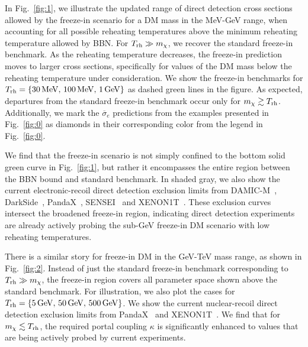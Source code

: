 \documentclass[notitlepage,nofootinbib,preprintnumbers,aps,superscriptaddress,twocolumn]{revtex4-1}
\begin{document}
In Fig.~\ref{fig:1}, we illustrate the updated range of direct detection cross sections allowed by the freeze-in scenario for a DM mass in the MeV-GeV range, when accounting for all possible reheating temperatures above the minimum reheating temperature allowed by BBN. For $T_{\rm rh}\gg m_\chi$, we recover the standard freeze-in benchmark. As the reheating temperature decreases, the freeze-in prediction moves to larger cross sections, specifically for values of the DM mass below the reheating temperature under consideration. We show the freeze-in benchmarks for $T_{\rm{rh}}=\{30\,\mathrm{MeV},\,100\,\mathrm{MeV},\, 1\,\mathrm{GeV}\}$ as dashed green lines in the figure. As expected, departures from the standard freeze-in benchmark occur only for $m_\chi\gtrsim T_{\rm{rh}}$. Additionally, we mark the $\overline{\sigma}_e$ predictions from the examples presented in Fig.~\ref{fig:0} as diamonds in their corresponding color from the legend in Fig.~\ref{fig:0}.

We find that the freeze-in scenario is not simply confined to the bottom solid green curve in Fig.~\ref{fig:1}, but rather it encompasses the entire region between the BBN bound and standard benchmark.
In shaded gray, we also show the current electronic-recoil direct detection exclusion limits from DAMIC-M~\cite{DAMIC-M:2023gxo,DAMIC-M:2023hgj}, DarkSide~\cite{DarkSide:2022knj}, PandaX~\cite{PandaX-II:2017hlx,PandaX:2022xqx}, SENSEI~\cite{SENSEI:2020dpa} and XENON1T~\cite{XENON:2018voc,Hambye:2018dpi}.
These exclusion curves intersect the broadened freeze-in region, indicating direct detection experiments are already actively probing the sub-GeV freeze-in DM scenario with low reheating temperatures.

There is a similar story for freeze-in DM in the GeV-TeV mass range, as shown in Fig.~\ref{fig:2}. Instead of just the standard freeze-in benchmark corresponding to $T_{\rm rh}\gg m_\chi$, the freeze-in region covers all parameter space shown above the standard benchmark. For illustration, we also plot the cases for $T_{\rm{rh}}=\{5\,\mathrm{GeV},\,50\,\mathrm{GeV},\, 500\,\mathrm{GeV}\}$.
We show the current nuclear-recoil direct detection exclusion limits from PandaX~\cite{PandaX-II:2017hlx} and XENON1T~\cite{XENON:2018voc,Hambye:2018dpi}. We find that for $m_\chi\lesssim T_{\rm rh}$, the required portal coupling $\kappa$ is significantly enhanced to values that are being actively probed by current experiments.
\end{document}

